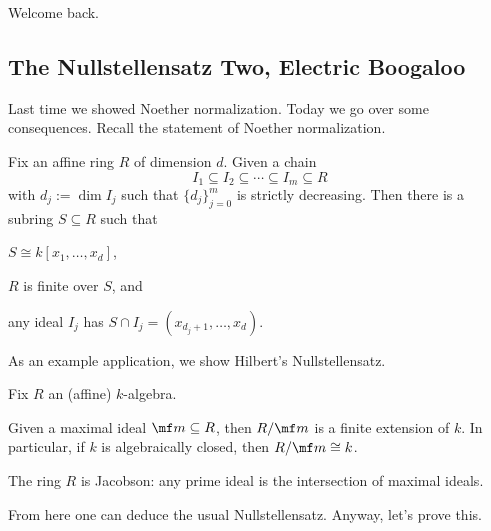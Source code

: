 
Welcome back.

\subsection{The Nullstellensatz Two, Electric Boogaloo}
Last time we showed Noether normalization. Today we go over some consequences. Recall the statement of Noether normalization.
\begin{theorem}
	Fix an affine ring $R$ of dimension $d$. Given a chain
	\[I_1\subseteq I_2\subseteq\cdots\subseteq I_m\subseteq R\]
	with $d_j:=\dim I_j$ such that $\{d_j\}_{j=0}^m$ is strictly decreasing. Then there is a subring $S\subseteq R$ such that
	\begin{listalph}
		\item $S\cong k[x_1,\ldots,x_d]$,
		\item $R$ is finite over $S$, and
		\item any ideal $I_j$ has $S\cap I_j=(x_{d_j+1},\ldots,x_d)$.
	\end{listalph}
\end{theorem}
As an example application, we show Hilbert's Nullstellensatz.
\begin{theorem}[Nullstellensatz]
	Fix $R$ an (affine) $k$-algebra.
	\begin{listalph}
		\item Given a maximal ideal $\mf m\subseteq R$, then $R/\mf m$ is a finite extension of $k$. In particular, if $k$ is algebraically closed, then $R/\mf m\cong k$.
		\item The ring $R$ is Jacobson: any prime ideal is the intersection of maximal ideals.
	\end{listalph}
\end{theorem}
From here one can deduce the usual Nullstellensatz. Anyway, let's prove this.
